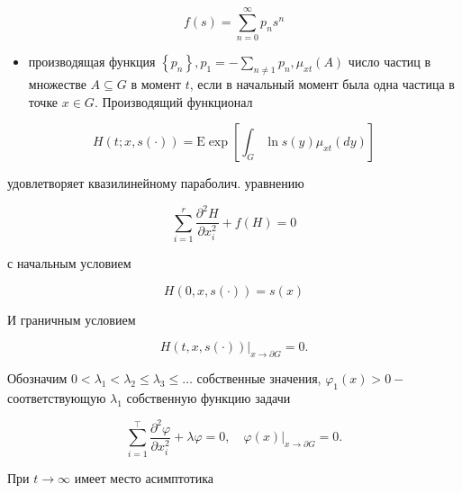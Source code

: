 \documentclass[10pt]{article}
\begin{document}
\[

f(s)=\sum_{n=0}^{\infty} p_{n} s^{n}

\]



\begin{itemize}

  \item производящая функция $\left\{p_{n}\right\}, p_{1}=-\sum_{n \neq 1} p_{n}, \mu_{x t}(A)$ число частиц в множестве $A \subseteq G$ в момент $t$, если в начальный момент была одна частица в точке $x \in G$. Производящий функционал

\end{itemize}



\[

H(t ; x, s(\cdot))=\mathrm{E} \exp \left[\int_{G} \ln s(y) \mu_{x t}(d y)\right]

\]



удовлетворяет квазилинейному параболич. уравнению



\[

\sum_{i=1}^{r} \frac{\partial^{2} H}{\partial x_{i}^{2}}+f(H)=0

\]



с начальным условием



\[

H(0, x, s(\cdot))=s(x)

\]



И граничным условием



\[

\left.H(t, x, s(\cdot))\right|_{x \rightarrow \partial G}=0 .

\]



Обозначим $0<\lambda_{1}<\lambda_{2} \leqslant \lambda_{3} \leqslant \ldots$ собственные значения, $\varphi_{1}(x)>0-$ соответствующую $\lambda_{1}$ собственную функцию задачи



\[

\sum_{i=1}^{\top} \frac{\partial^{2} \varphi}{\partial x_{i}^{2}}+\lambda \varphi=0,\left.\quad \varphi(x)\right|_{x \rightarrow \partial G}=0 .

\]



При $t \rightarrow \infty$ имеет место асимптотика
\end{document}
